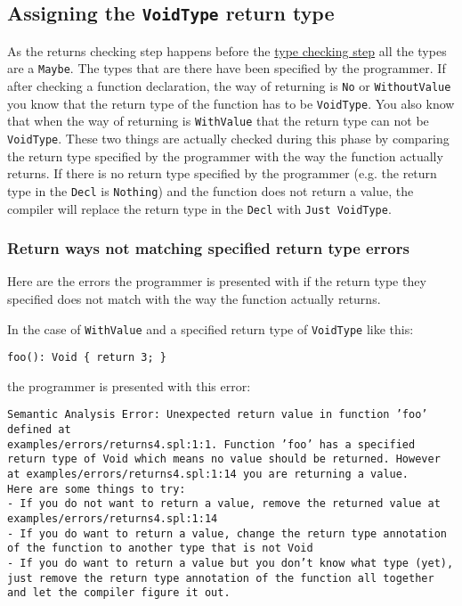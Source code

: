 \documentclass{report}
\begin{document}
\subsection{Assigning the \texttt{VoidType} return type}

As the returns checking step happens before the \hyperref[sec:Type-Checking]{type checking step} all the types are a \texttt{Maybe}. The types that are there have been specified by the programmer. 
If after checking a function declaration, the way of returning is \texttt{No} or \texttt{WithoutValue} you know that the return type of the function has to be \texttt{VoidType}. You also know that when the way of returning is \texttt{WithValue} that the return type can not be \texttt{VoidType}. These two things are actually checked during this phase by comparing the return type specified by the programmer with the way the function actually returns. If there is no return type specified by the programmer (e.g. the return type in the \texttt{Decl} is \texttt{Nothing}) and the function does not return a value, the compiler will replace the return type in the \texttt{Decl} with \texttt{Just VoidType}. 

\subsubsection{Return ways not matching specified return type errors}

Here are the errors the programmer is presented with if the return type they specified does not match with the way the function actually returns.

In the case of \texttt{WithValue} and a specified return type of \texttt{VoidType} like this:

\begin{lstlisting}[style=SPL]
    foo(): Void { return 3; }
\end{lstlisting}

the programmer is presented with this error:

\noindent \texttt{\textcolor{error}{Semantic Analysis Error: Unexpected return value} in function '\textcolor{name}{foo}' defined at \\\textcolor{filename}{examples/errors/returns4.spl:1:1}.
Function '\textcolor{name}{foo}' has a specified return type of \textcolor{type}{Void} which means no value should be returned.
However at \textcolor{filename}{examples/errors/returns4.spl:1:14} you are returning a value.\\
Here are some things to try:\\
- If you do not want to return a value, remove the returned value at \textcolor{filename}{examples/errors/returns4.spl:1:14}\\
- If you do want to return a value, change the return type annotation of the function to another type that is not \textcolor{type}{Void}\\
- If you do want to return a value but you don't know what type (yet), just remove the return type annotation of the function all together and let the compiler figure it out.\\}
\end{document}
